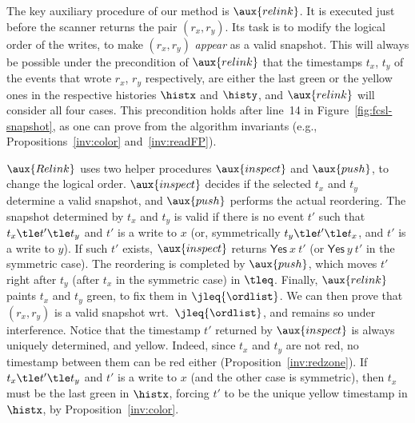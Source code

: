 The key auxiliary procedure of our method is $\aux{relink}$. It is
executed just before the scanner returns the pair $(r_x, r_y)$. Its
task is to modify the logical order of the writes, to make $(r_x,
r_y)$ \emph{appear} as a valid snapshot. This will always be possible
under the precondition of $\aux{relink}$ that the timestamps $t_x$,
$t_y$ of the events that wrote $r_x$, $r_y$ respectively, are either
the last green or the yellow ones in the respective histories $\histx$
and $\histy$, and $\aux{relink}$ will consider all four cases. This
precondition holds after line~14 in Figure~\ref{fig:fcsl-snapshot}, as
one can prove from the algorithm invariants (e.g.,
Propositions~\ref{inv:color} and~\ref{inv:readFP}).
%

%

$\aux{Relink}$ uses two helper procedures $\aux{inspect}$ and
$\aux{push}$, to change the logical order. $\aux{inspect}$ decides if
the selected $t_x$ and $t_y$ determine a valid snapshot, and
$\aux{push}$ performs the actual reordering. The snapshot determined
by $t_x$ and $t_y$ is valid if there is no event $t'$ such that
$t_x \tle t' \tle t_y$ and $t'$ is a write to $x$ (or, symmetrically
$t_y \tle t' \tle t_x$, and $t'$ is a write to $y$). If such $t'$
exists, $\aux{inspect}$ returns $\mathsf{Yes}\ x\ t'$ (or
$\mathsf{Yes}\ y\ t'$ in the symmetric case). The reordering is
completed by $\aux{push}$, which moves $t'$ right after $t_y$ (after
$t_x$ in the symmetric case) in $\tleq$. Finally, $\aux{relink}$
paints $t_x$ and $t_y$ green, to fix them in $\jleq{\ordlist}$. We can then
prove that $(r_x, r_y)$ is a valid snapshot wrt.~$\jleq{\ordlist}$, and remains
so under interference. 
%
Notice that the timestamp $t'$ returned by $\aux{inspect}$ is always
uniquely determined, and yellow. Indeed, since $t_x$ and $t_y$ are not
red, no timestamp between them can be red either
(Proposition~\ref{inv:redzone}). If $t_x \tle t' \tle t_y$ and $t'$ is
a write to $x$ (and the other case is symmetric), then $t_x$ must be
the last green in $\histx$, forcing $t'$ to be the unique yellow
timestamp in $\histx$, by Proposition~\ref{inv:color}.

